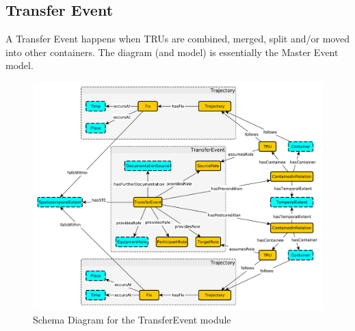 \subsection{Transfer Event}
\label{ssec:transfer}
A Transfer Event happens when TRUs are combined, merged, split and/or moved into other containers. The diagram (and model) is essentially the Master Event model. 

\begin{figure}[tb]
\begin{center}
\includegraphics[width=\textwidth]{diagrams/transfer-event}
\end{center}
\caption{Schema Diagram for the TransferEvent module}
\label{fig:TransferEvent}
\end{figure}

